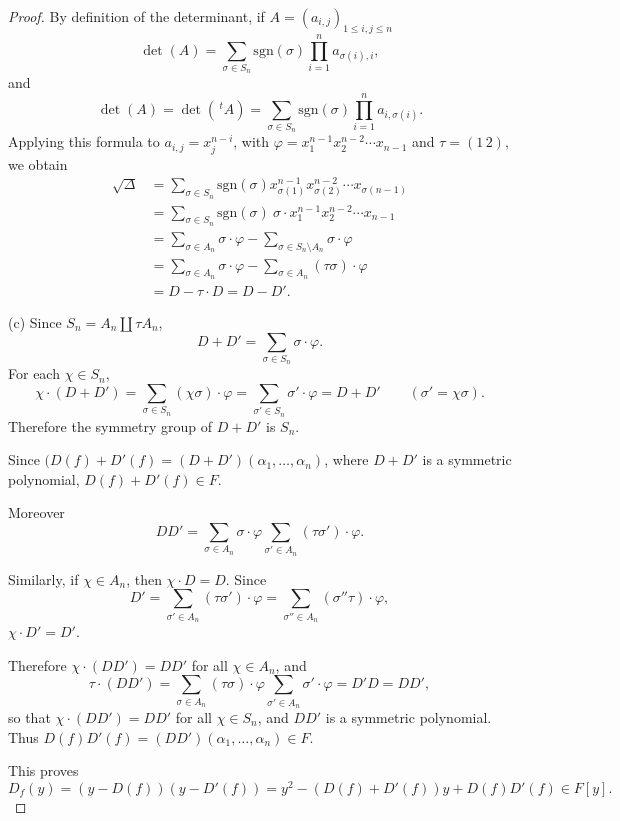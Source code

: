 \documentclass[11pt,a4paper]{article}
\begin{document}
{\begin{proof}
By definition of the determinant, if $A = (a_{i,j})_{1\leq i,j \leq n}$
$$\det(A)=\sum_{\sigma \in S_n}\mathrm{sgn}(\sigma)  \prod_{i=1}^n a_{\sigma(i),i},
$$
and
$$ 
 \det(A) = \det(\,^t A) =\sum_{\sigma \in S_n}\mathrm{sgn}(\sigma)  \prod_{i=1}^n a_{i,\sigma(i)}.
$$
Applying this formula to $a_{i,j} = x_j^{n-i}$, with $\varphi = x_1^{n-1} x_2^{n-2}\cdots x_{n-1}$ and $\tau = (1\,2)$, we obtain
\begin{align*}
\sqrt{\Delta} &= \sum_{\sigma \in S_n} \mathrm{sgn}(\sigma)  x_{\sigma(1)}^{n-1} x_{\sigma(2)}^{n-2}\cdots x_{\sigma(n-1)}\\
&= \sum_{\sigma \in S_n} \mathrm{sgn}(\sigma)\  \sigma\cdot x_1^{n-1} x_2^{n-2}\cdots x_{n-1}\\
&= \sum_{\sigma \in A_n}  \sigma\cdot \varphi-  \sum_{\sigma \in S_n\setminus A_n} \sigma\cdot \varphi\\
&= \sum_{\sigma \in A_n} \sigma\cdot \varphi - \sum_{\sigma \in A_n} (\tau\sigma) \cdot \varphi\\
&=D - \tau\cdot D = D - D'.
\end{align*}


\item[(c)] Since $S_n = A_n \coprod \tau A_n$,
$$D + D' =  \sum_{\sigma \in S_n} \sigma\cdot \varphi.$$
For each $\chi \in S_n$, 
$$\chi \cdot (D+D') = \sum_{\sigma \in S_n} (\chi\sigma) \cdot \varphi  = \sum_{\sigma' \in S_n} \sigma' \cdot \varphi  = D+D' \qquad (\sigma' = \chi \sigma).$$
Therefore the symmetry group of $D+D'$ is $S_n$.

Since $(D(f)+ D'(f)=  (D+D')(\alpha_1,\ldots,\alpha_n)$, where $D+D'$ is a symmetric polynomial, $D(f) + D'(f) \in F$.

Moreover
$$DD' = \sum_{\sigma \in A_n} \sigma\cdot \varphi \sum_{\sigma' \in A_n} (\tau \sigma')\cdot \varphi.$$

Similarly, if $\chi \in A_n$, then $\chi \cdot D = D$. Since 
$$D' =\sum_{\sigma' \in A_n} (\tau \sigma')\cdot \varphi = \sum_{\sigma'' \in A_n}(\sigma'' \tau) \cdot \varphi,$$
$\chi \cdot D' = D'$.

Therefore $\chi\cdot (DD') = DD'$ for all $\chi \in A_n$, and 
$$\tau \cdot (DD') = \sum_{\sigma \in A_n} (\tau\sigma)\cdot \varphi \sum_{\sigma' \in A_n}  \sigma' \cdot \varphi = D'D = DD',$$
so that $\chi\cdot (DD') = DD'$ for all $\chi \in S_n$, and $DD'$ is a symmetric polynomial. Thus $D(f) D'(f) = (DD')(\alpha_1,\ldots,\alpha_n) \in F$.

This proves 
$$D_f(y) = (y - D(f))(y - D'(f)) = y^2 - (D(f)+D'(f)) y + D(f)D'(f) \in F[y].$$


\end{proof}}
\end{document}
